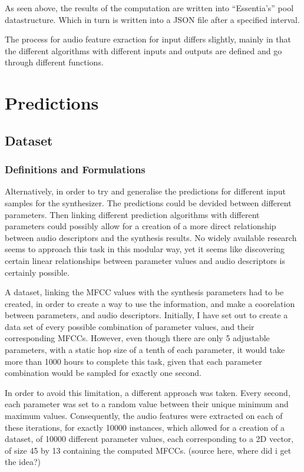 As seen above, the results of the computation are written into
``Essentia's'' pool datastructure. Which in turn is written into a
JSON file after a specified interval.

The process for audio feature exraction for input differs slightly,
mainly in that the different algorithms with different inputs and
outputs are defined and go through different functions.

\section{Predictions}
\subsection{Dataset}
\subsubsection{Definitions and Formulations}
Alternatively, in order to try and generalise the predictions for
different input samples for the synthesizer. The predictions could be
devided between different parameters. Then linking different
prediction algorithms with different parameters could possibly allow
for a creation of a more direct relationship between audio descriptors
and the synthesis results. No widely available research seems to
approach this task in this modular way, yet it seems like discovering
certain linear relationships between parameter values and audio
descriptors is certainly possible.
%

A dataset, linking the MFCC values with the synthesis parameters had
to be created, in order to create a way to use the information, and
make a coorelation between parameters, and audio
descriptors. Initially, I have set out to create a data set of every
possible combination of parameter values, and their corresponding
MFCCs. However, even though there are only 5 adjustable parameters,
with a static hop size of a tenth of each parameter, it would take
more than 1000 hours to complete this task, given that each parameter
combination would be sampled for exactly one second.

In order to avoid this limitation, a different approach was
taken. Every second, each parameter was set to a random value between
their unique minimum and maximum values. Consequently, the audio
features were extracted on each of these iterations, for exactly 10000
instances, which allowed for a creation of a dataset, of 10000
different parameter values, each corresponding to a 2D vector, of
size 45 by 13 containing the computed MFCCs. (source here, where
did i get the idea?)

